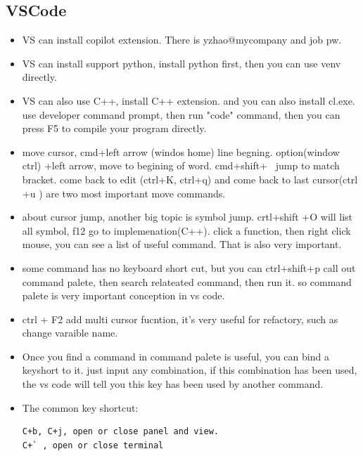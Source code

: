 \documentclass[a4paper,11pt,twoside]{book}
\begin{document}
\subsection{VSCode}
\begin{itemize}
	
	\item VS can install copilot extension. There is yzhao@mycompany and job pw. 
	
	\item VS can install support python, install python first, then you can use venv directly. 
	
	\item VS can also use C++, install C++ extension. and you can also install cl.exe. use developer command prompt, then run "code" command, then you can press F5 to compile your program directly. 
	
	\item move cursor, cmd+left arrow (windos home)  line begning.  option(window ctrl) +left arrow, move to begining of word. cmd+shift+ \ jump to match bracket.  come back to edit (ctrl+K, ctrl+q) and come back to last cursor(ctrl +u ) are two most important move commands. 
	
	\item about cursor jump, another big topic is symbol jump. crtl+shift +O will list all symbol,  f12 go to implemenation(C++). click a function, then right click mouse, you can see a list of useful command.  That is also very important. 
	
	\item some command has no keyboard short cut, but you can ctrl+shift+p call out command palete, then search relateated command, then run it.  so command palete is very important conception in vs code. 
	
	\item ctrl + F2 add multi cursor fucntion, it's very useful for refactory, such as change varaible name. 
	
	\item Once you find a command in command palete is useful, you can bind a keyshort to it.  just input any combination, if this combination has been used,  the vs code will tell you this key has been used by another command. 
	
    \item The common key shortcut:

\begin{lstlisting}[]
C+b, C+j, open or close panel and view. 
C+` , open or close terminal


\end{lstlisting}
\end{itemize}
\end{document}

